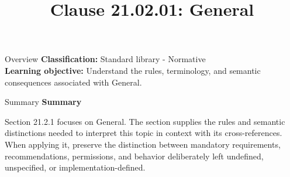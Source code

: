 \documentclass[10pt,letterpaper]{article}
\title{Clause 21.02.01: General}
\author{}
\date{}
\begin{document}
\maketitle
\begin{CornellOverviewBox}{Overview}
\textbf{Classification:} Standard library - Normative\\[2pt]
\textbf{Learning objective:} Understand the rules, terminology, and semantic consequences associated with General.
\end{CornellOverviewBox}\begin{CornellSummaryBox}{Summary}
{\sffamily\bfseries\color{Accent} Summary}\par\vspace{3pt}Section 21.2.1 focuses on General. The section supplies the rules and semantic distinctions needed to interpret this topic in context with its cross-references. When applying it, preserve the distinction between mandatory requirements, recommendations, permissions, and behavior deliberately left undefined, unspecified, or implementation-defined.
\end{CornellSummaryBox}
\end{document}
